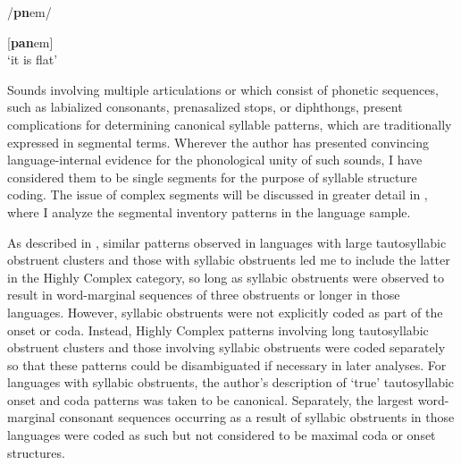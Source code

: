 /\textbf{pn}em/

[\textbf{pan}em]\\
\glt ‘it is flat’
\citep[35-6]{Dol2007}
\z

  Sounds involving multiple articulations or which consist of phonetic sequences, such as labialized consonants, prenasalized stops, or diphthongs, present complications for determining canonical syllable patterns, which are traditionally expressed in segmental terms. Wherever the author has presented convincing language-internal evidence for the phonological unity of such sounds, I have considered them to be single segments for the purpose of syllable structure coding. The issue of complex segments will be discussed in greater detail in , where I analyze the segmental inventory patterns in the language sample.

  As described in , similar patterns observed in languages with large tautosyllabic obstruent clusters and those with syllabic obstruents led me to include the latter in the Highly Complex category, so long as syllabic obstruents were observed to result in word-marginal sequences of three obstruents or longer in those languages. However, syllabic obstruents were not explicitly coded as part of the onset or coda. Instead, Highly Complex patterns involving long tautosyllabic obstruent clusters and those involving syllabic obstruents were coded separately so that these patterns could be disambiguated if necessary in later analyses. For languages with syllabic obstruents, the author’s description of ‘true’ tautosyllabic onset and coda patterns was taken to be canonical. Separately, the largest word-marginal consonant sequences occurring as a result of syllabic obstruents in those languages were coded as such but not considered to be maximal coda or onset structures.

